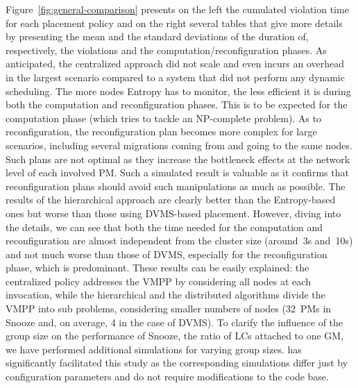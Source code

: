 Figure~\ref{fig:general-comparison} presents on the left the cumulated
violation time for each placement policy and on the right several
tables that give more details by presenting the mean and the standard
deviations of the duration of, respectively, the violations and the
computation/reconfiguration phases. As anticipated, the centralized
approach did not scale and even incurs an overhead in the largest
scenario compared to a system that did not perform any dynamic
scheduling. The more nodes Entropy has to monitor, the less efficient
it is during both the computation and reconfiguration phases.
This is to be expected for the computation phase (which tries to
tackle an NP-complete problem).  As to reconfiguration,
the reconfiguration plan becomes more complex for large scenarios,
including several migrations coming from and going to the same
nodes. Such plans are not optimal as they increase the bottleneck
effects at the network level of each involved PM. Such a simulated
result is valuable as it confirms that reconfiguration plans should
avoid such manipulations as much as possible.
%
The results of the hierarchical approach are clearly better than the
Entropy-based ones but worse than those using DVMS-based
placement. However, diving into the details, we can see that both the
time needed for the computation and reconfiguration are almost
independent from the cluster size (around~3s and~10s) and not much
worse than those of DVMS, especially for the reconfiguration phase,
which is predominant. These results can be easily explained: the
centralized policy addresses the VMPP by considering all nodes at each
invocation, while the hierarchical and the distributed algorithms
divide the VMPP into sub problems, considering smaller numbers of
nodes (32~PMs in Snooze and, on average, 4 in the case of DVMS). To
clarify the influence of the group size on the performance of Snooze,
\ie the ratio of LCs attached to one GM, we have performed additional
simulations for varying group sizes.  \vmps has significantly
facilitated this study as the corresponding simulations differ just by
configuration parameters and do not require modifications to the code
base.

